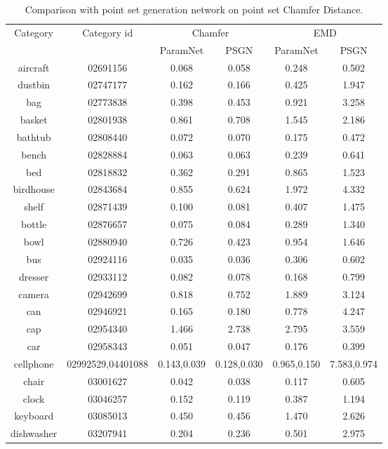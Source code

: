 \begin{table}
	\caption{Comparison with point set generation network on point set Chamfer Distance. }
	\label{tab:seg}
	\centering
	\begin{tabular}{c c c c c c}
		\multirow{2}{*}{Category} & \multirow{2}{*}{Category id} & \multicolumn{2}{c}{Chamfer} & \multicolumn{2}{c}{EMD}\\ \cmidrule(lr){3-4} \cmidrule(lr){5-6}
		&	& ParamNet & PSGN\cite{PSGN}       & ParamNet & PSGN\cite{PSGN}\\
		\hline
		aircraft & 02691156 & 0.068 & 0.058 & 0.248 & 0.502 \\   
		dustbin & 02747177 & 0.162 & 0.166 & 0.425 & 1.947 \\
		bag & 02773838  & 0.398 & 0.453 & 0.921 & 3.258 \\
		basket & 02801938 & 0.861 & 0.708 & 1.545 & 2.186 \\
		bathtub & 02808440 & 0.072 & 0.070 & 0.175 & 0.472 \\
		bench & 02828884 & 0.063 & 0.063 & 0.239 & 0.641 \\
		bed & 02818832 & 0.362 & 0.291 & 0.865 & 1.523 \\
		birdhouse & 02843684 & 0.855 & 0.624 & 1.972 & 4.332 \\
		shelf & 02871439 & 0.100 & 0.081 & 0.407 & 1.475 \\
		bottle & 02876657 & 0.075 & 0.084 & 0.289 & 1.340 \\
		bowl & 02880940 & 0.726 & 0.423 & 0.954 & 1.646 \\
		bus & 02924116 & 0.035 & 0.036 & 0.306 & 0.602\\
		dresser & 02933112 & 0.082 & 0.078 & 0.168 & 0.799 \\
		camera & 02942699 & 0.818 & 0.752 & 1.889 & 3.124 \\
		can & 02946921 & 0.165 & 0.180 & 0.778 & 4.247 \\
		cap & 02954340 & 1.466 & 2.738 & 2.795 & 3.559 \\
		car & 02958343 & 0.051 & 0.047 & 0.176 & 0.399 \\
		cellphone & 02992529,04401088 & 0.143,0.039 & 0.128,0.030& 0.965,0.150 & 7.583,0.974\\
		chair & 03001627 & 0.042 & 0.038 & 0.117 & 0.605 \\
		clock & 03046257 & 0.152 & 0.119 & 0.387 & 1.194 \\
		keyboard & 03085013 & 0.450 & 0.456 & 1.470 & 2.626\\
		dishwasher & 03207941 & 0.204 & 0.236 & 0.501 & 2.975 \\

\end{tabular}
\end{table}
